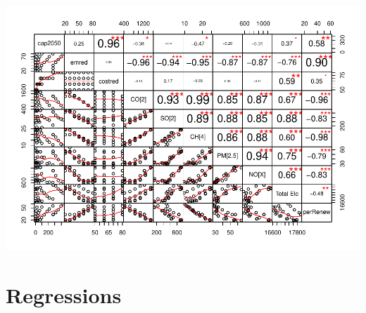 \documentclass[]{article}
\begin{document}
\includegraphics{osw_Report_files/figure-latex/unnamed-chunk-66-1.pdf}

\hypertarget{regressions}{%
\section{Regressions}\label{regressions}}

 
  \providecommand{\huxb}[2]{\arrayrulecolor[RGB]{#1}\global\arrayrulewidth=#2pt}
  \providecommand{\huxvb}[2]{\color[RGB]{#1}\vrule width #2pt}
  \providecommand{\huxtpad}[1]{\rule{0pt}{\baselineskip+#1}}
  \providecommand{\huxbpad}[1]{\rule[-#1]{0pt}{#1}}
\end{document}
